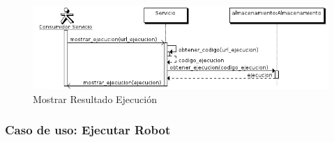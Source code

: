 \begin{figure}[bp!]
  \includegraphics[width=1\textwidth]{chapters/technical-manual/diagrams/sequence/mostrar_resultado_ejecucion.png}
\caption{Mostrar Resultado Ejecución}
\end{figure}
\clearpage

\subsubsection{\large{Caso de uso: Ejecutar Robot}}


